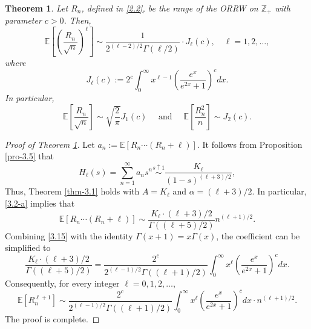\documentclass[10pt,a4paper]{amsart}
\newtheorem{thm}{Theorem}
\begin{document}
\begin{thm}\label{thm-1.1}
 Let $R_{n}$, defined in \eqref{2.2}, be  the range of the ORRW on $\mathbb{Z}_{+}$ with parameter $c>0$. Then,
\begin{equation*}
\mathbb{E}\left[\left(\frac{R_{n}}{\sqrt{n}}\right)^{\ell}\right] \sim \frac{1}{2^{(\ell-2)/2}
\Gamma(\ell/2)} \cdot J_{\ell}(c),\quad \ell=1,2, \ldots,
\end{equation*}
where
\begin{equation*}
J_{\ell}(c):=2^{c} \int_{0}^{\infty} x^{\ell-1}\left(\frac{e^{x}}{e^{2x}+1}\right)^{c}dx.
\end{equation*}
In particular,
\begin{equation*}
\mathbb{E}\left[\frac{R_{n}}{\sqrt{n}}\right] \sim \sqrt{\frac{2}{\pi}} J_{1}(c) \quad \text { and } \quad \mathbb{E}\left[\frac{R_{n}^{2}}{n}\right] \sim J_{2}(c).
\end{equation*}
\end{thm}

\begin{proof}[Proof of Theorem \ref{thm-1.1}]

Let $a_n := \mathbb{E}[R_n \cdots (R_n + \ell)]$. It follows from Proposition \ref{pro-3.5} that
\begin{equation*}
H_\ell(s) = \sum_{n=1}^\infty a_n s^n \stackrel{s \uparrow 1}{\sim} \frac{K_\ell}{(1-s)^{(\ell+3)/2}},
\end{equation*}
Thus, Theorem \ref{thm-3.1} holds with $A=K_{\ell}$ and $\alpha = (\ell+3)/2$. In particular, \eqref{3.2-a} implies that
\begin{equation*}
\mathbb{E}[R_n \cdots (R_n + \ell)]\sim
\frac{K_{\ell}\cdot (\ell +3)/2}{\Gamma((\ell+5)/2)}n^{(\ell+1)/2}.
\end{equation*}
Combining \eqref{3.15} with the identity  $\Gamma(x+1)=x\Gamma(x)$, the coefficient
can be simplified  to
\[
\frac{K_{\ell}\cdot (\ell +3)/2}{\Gamma((\ell+5)/2)}
=\frac{2^{c}}{2^{(\ell-1)/2}\Gamma((\ell+1)/2)} \int_{0}^{\infty}x^{\ell }\left( \frac{e^{x}}{e^{2x}+1} \right)^{c}dx.
\]
Consequently,  for  every integer  $\ell=0, 1, 2,\ldots$,
\[
\mathbb{E}[R_{n}^{\ell+1}] \sim
\frac{2^{c}}{2^{(\ell-1)/2}\Gamma((\ell+1)/2)} \int_{0}^{\infty}x^{\ell }\left( \frac{e^{x}}{e^{2x}+1} \right)^{c}dx  \cdot n^{(\ell+1)/2}.
\]
The proof is complete.
\end{proof}
\end{document}
